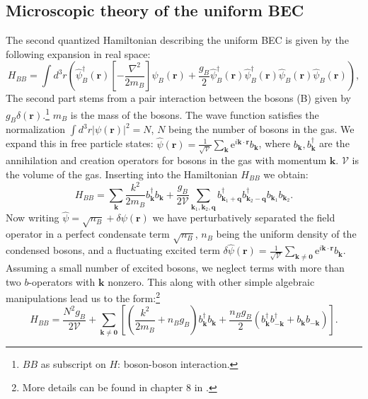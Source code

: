 \subsection{Microscopic theory of the uniform BEC}
\label{sec.BEC}
The second quantized Hamiltonian describing the uniform BEC is given by the following expansion in real space: 
\begin{equation}
H_{BB} = \int d^3 r \left(\hat{\psi}_B^\dagger(\mathbf{r})\left[-\frac{\nabla^2}{2m_B}\right]\hat{\psi}_B(\mathbf{r}) + \frac{g_B}{2}\hat{\psi}_B^\dagger(\mathbf{r})\hat{\psi}_B^\dagger(\mathbf{r})\hat{\psi}_B(\mathbf{r})\hat{\psi}_B(\mathbf{r})  \right), 
\end{equation}
The second part stems from a pair interaction between the bosons (B) given by $g_B\delta(\mathbf{r})$.\footnote{$BB$ as subscript on $H$: boson-boson interaction.} $m_B$ is the mass of the bosons. The wave function satisfies the normalization $\int d^3 r |\psi(\mathbf{r})|^2 = N$, $N$ being the number of bosons in the gas. We expand this in free particle states: $\hat{\psi}(\mathbf{r}) = \frac{1}{\sqrt{\mathcal{V}}}\sum_\mathbf{k} \text{e}^{i\mathbf{k}\cdot\mathbf{r}}b_\mathbf{k}$, where $b_\mathbf{k}, b^\dagger_\mathbf{k}$ are the annihilation and creation operators for bosons in the gas with momentum $\mathbf{k}$. $\mathcal{V}$ is the volume of the gas. Inserting into the Hamiltonian $H_{BB}$ we obtain: 
\begin{equation}
H_{BB} = \sum_\mathbf{k} \frac{k^2}{2m_B}b_\mathbf{k}^\dagger b_\mathbf{k} + \frac{g_B}{2\mathcal{V}}\sum_{\mathbf{k}_1,\mathbf{k}_2,\mathbf{q}} b^\dagger_{\mathbf{k}_1+\mathbf{q}}b^\dagger_{\mathbf{k}_2-\mathbf{q}}b_{\mathbf{k}_1}b_{\mathbf{k}_2}.  
\end{equation}
Now writing $\hat{\psi} = \sqrt{n_B} + \delta \psi(\mathbf{r})$ we have perturbatively separated the field operator in a perfect condensate term $\sqrt{n_B}$, $n_B$ being the uniform density of the condensed bosons, and a fluctuating excited term $\delta \hat{\psi}(\mathbf{r}) =  \frac{1}{\sqrt{\mathcal{V}}}\sum_{\mathbf{k}\neq \mathbf{0}} \text{e}^{i\mathbf{k}\cdot\mathbf{r}}b_\mathbf{k}$. Assuming a small number of excited bosons, we neglect terms with more than two $b$-operators with $\mathbf{k}$ nonzero. This along with other simple algebraic manipulations lead us to the form:\footnote{More details can be found in chapter 8 in \cite{Pethick}.} 
\begin{equation}
H_{BB} = \frac{N^2g_B}{2\mathcal{V}} + \sum_{\mathbf{k}\neq \mathbf{0}}\left[\left(\frac{k^2}{2m_B}+n_Bg_B\right)b_\mathbf{k}^\dagger b_\mathbf{k} + \frac{n_Bg_B}{2}\left( b_\mathbf{k}^\dagger b_{-\mathbf{k}}^\dagger + b_{\mathbf{k}} b_{-\mathbf{k}} \right) \right].
\label{eq.bosonHamiltonian}
\end{equation}
